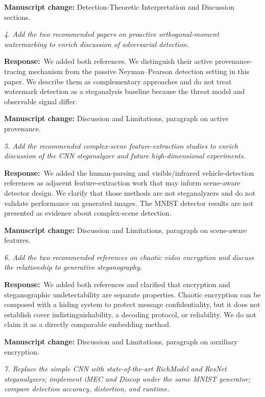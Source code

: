 \documentclass[12pt,a4paper]{article}
\newcommand{\revcomment}[1]{\par\medskip\noindent\colorbox{gray!15}{\parbox{\dimexpr\linewidth-2\fboxsep}{\itshape #1}}\par\medskip}
\newcommand{\ourresponse}{\noindent\textbf{Response:}\ }
\newcommand{\manuscriptchange}[1]{\par\smallskip\noindent\textcolor{blue!70!black}{\textbf{Manuscript change:} #1}\par\smallskip}
\begin{document}
\manuscriptchange{Detection-Theoretic Interpretation and Discussion sections.}

\revcomment{4. Add the two recommended papers on proactive orthogonal-moment watermarking to enrich discussion of adversarial detection.}

\ourresponse We added both references. We distinguish their active provenance-tracing mechanism from the passive Neyman--Pearson detection setting in this paper. We describe them as complementary approaches and do not treat watermark detection as a steganalysis baseline because the threat model and observable signal differ.

\manuscriptchange{Discussion and Limitations, paragraph on active provenance.}

\revcomment{5. Add the recommended complex-scene feature-extraction studies to enrich discussion of the CNN steganalyzer and future high-dimensional experiments.}

\ourresponse We added the human-parsing and visible/infrared vehicle-detection references as adjacent feature-extraction work that may inform scene-aware detector design. We clarify that those methods are not steganalyzers and do not validate performance on generated images. The MNIST detector results are not presented as evidence about complex-scene detection.

\manuscriptchange{Discussion and Limitations, paragraph on scene-aware features.}

\revcomment{6. Add the two recommended references on chaotic video encryption and discuss the relationship to generative steganography.}

\ourresponse We added both references and clarified that encryption and steganographic undetectability are separate properties. Chaotic encryption can be composed with a hiding system to protect message confidentiality, but it does not establish cover indistinguishability, a decoding protocol, or reliability. We do not claim it as a directly comparable embedding method.

\manuscriptchange{Discussion and Limitations, paragraph on auxiliary encryption.}

\revcomment{7. Replace the simple CNN with state-of-the-art RichModel and ResNet steganalyzers; implement iMEC and Discop under the same MNIST generator; compare detection accuracy, distortion, and runtime.}
\end{document}
